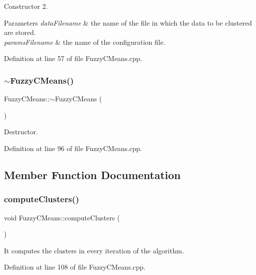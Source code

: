 Constructor 2. 
\begin{DoxyParams}{Parameters}
{\em data\+Filename} & the name of the file in which the data to be clustered are stored. \\
\hline
{\em params\+Filename} & the name of the configuration file. \\
\hline
\end{DoxyParams}


Definition at line 57 of file Fuzzy\+C\+Means.\+cpp.

\mbox{\label{class_fuzzy_c_means_ae3175d6a98d93d476c37da164252f7de}} 
\subsubsection{$\sim$\+Fuzzy\+C\+Means()}
{\footnotesize\ttfamily Fuzzy\+C\+Means\+::$\sim$\+Fuzzy\+C\+Means (\begin{DoxyParamCaption}{ }\end{DoxyParamCaption})}

Destructor. 

Definition at line 96 of file Fuzzy\+C\+Means.\+cpp.



\subsection{Member Function Documentation}
\mbox{\label{class_fuzzy_c_means_ab3b80b7e5ab918bfd801e1df9a370390}} 
\subsubsection{compute\+Clusters()}
{\footnotesize\ttfamily void Fuzzy\+C\+Means\+::compute\+Clusters (\begin{DoxyParamCaption}{ }\end{DoxyParamCaption})}

It computes the clusters in every iteration of the algorithm. 

Definition at line 108 of file Fuzzy\+C\+Means.\+cpp.

\mbox{\label{class_fuzzy_c_means_a3a9758bfef32ece7efa7c17a65f55371}} 
